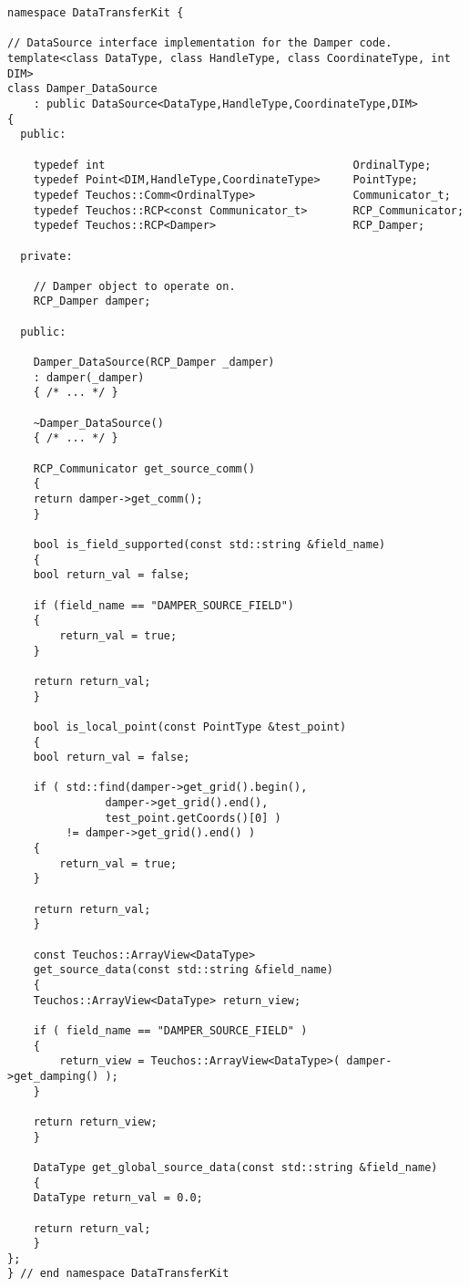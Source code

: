 \documentclass[letterpaper]{article}
\begin{document}
\begin{lstlisting}
namespace DataTransferKit {

// DataSource interface implementation for the Damper code.
template<class DataType, class HandleType, class CoordinateType, int DIM>
class Damper_DataSource 
    : public DataSource<DataType,HandleType,CoordinateType,DIM>
{
  public:

    typedef int                                      OrdinalType;
    typedef Point<DIM,HandleType,CoordinateType>     PointType;
    typedef Teuchos::Comm<OrdinalType>               Communicator_t;
    typedef Teuchos::RCP<const Communicator_t>       RCP_Communicator;
    typedef Teuchos::RCP<Damper>                     RCP_Damper;

  private:

    // Damper object to operate on.
    RCP_Damper damper;

  public:

    Damper_DataSource(RCP_Damper _damper)
	: damper(_damper)
    { /* ... */ }

    ~Damper_DataSource()
    { /* ... */ }

    RCP_Communicator get_source_comm()
    {
	return damper->get_comm();
    }

    bool is_field_supported(const std::string &field_name)
    {
	bool return_val = false;

	if (field_name == "DAMPER_SOURCE_FIELD")
	{
	    return_val = true;
	}

	return return_val;
    }

    bool is_local_point(const PointType &test_point)
    {
	bool return_val = false;

	if ( std::find(damper->get_grid().begin(), 
		       damper->get_grid().end(),
		       test_point.getCoords()[0] )
	     != damper->get_grid().end() )
	{
	    return_val = true;
	}

	return return_val;
    }

    const Teuchos::ArrayView<DataType> 
    get_source_data(const std::string &field_name)
    {
	Teuchos::ArrayView<DataType> return_view;

	if ( field_name == "DAMPER_SOURCE_FIELD" )
	{
	    return_view = Teuchos::ArrayView<DataType>( damper->get_damping() );
	}

	return return_view;
    }

    DataType get_global_source_data(const std::string &field_name)
    {
	DataType return_val = 0.0;

	return return_val;
    }
};
} // end namespace DataTransferKit
\end{lstlisting}
\end{document}
